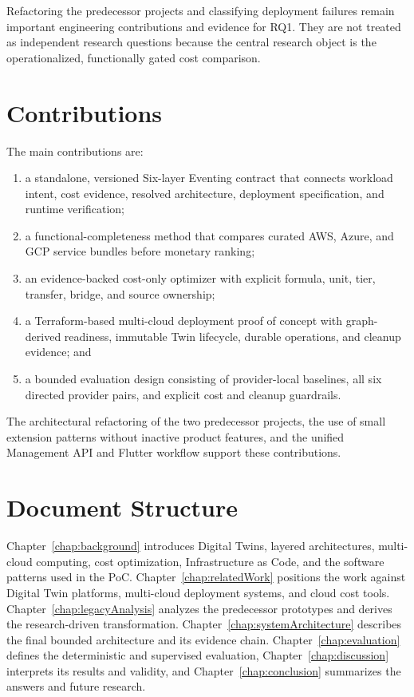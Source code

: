 Refactoring the predecessor projects and classifying deployment failures
remain important engineering contributions and evidence for RQ1. They are not
treated as independent research questions because the central research object
is the operationalized, functionally gated cost comparison.

\section{Contributions}

The main contributions are:

\begin{enumerate}
    \item a standalone, versioned Six-layer Eventing contract that connects
    workload intent, cost evidence, resolved architecture, deployment
    specification, and runtime verification;
    \item a functional-completeness method that compares curated AWS, Azure,
    and GCP service bundles before monetary ranking;
    \item an evidence-backed cost-only optimizer with explicit formula, unit,
    tier, transfer, bridge, and source ownership;
    \item a Terraform-based multi-cloud deployment proof of concept with
    graph-derived readiness, immutable Twin lifecycle, durable operations, and
    cleanup evidence; and
    \item a bounded evaluation design consisting of provider-local baselines,
    all six directed provider pairs, and explicit cost and cleanup guardrails.
\end{enumerate}

The architectural refactoring of the two predecessor projects, the use of
small extension patterns without inactive product features, and the unified
Management API and Flutter workflow support these contributions.

\section{Document Structure}

Chapter~\ref{chap:background} introduces Digital Twins, layered architectures,
multi-cloud computing, cost optimization, Infrastructure as Code, and the
software patterns used in the PoC. Chapter~\ref{chap:relatedWork} positions the
work against Digital Twin platforms, multi-cloud deployment systems, and cloud
cost tools. Chapter~\ref{chap:legacyAnalysis} analyzes the predecessor
prototypes and derives the research-driven transformation. Chapter~\ref{chap:systemArchitecture}
describes the final bounded architecture and its evidence chain.
Chapter~\ref{chap:evaluation} defines the deterministic and supervised
evaluation, Chapter~\ref{chap:discussion} interprets its results and validity,
and Chapter~\ref{chap:conclusion} summarizes the answers and future research.
